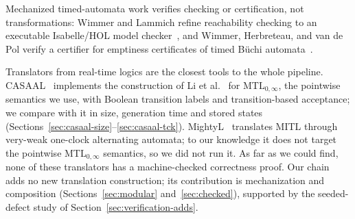 Mechanized timed-automata work verifies checking or certification, not transformations: Wimmer and Lammich refine reachability checking to an executable Isabelle/HOL model checker~\cite{munta_tacas18,munta_formats19}, and Wimmer, Herbreteau, and van de Pol verify a certifier for emptiness certificates of timed B\"uchi automata~\cite{wimmer_herbreteau_vandepol_formats2020}.

Translators from real-time logics are the closest tools to the whole pipeline. CASAAL~\cite{casaal_tool} implements the construction of Li et al.~\cite{li_spin7} for MTL$_{0,\infty}$, the pointwise semantics we use, with Boolean transition labels and transition-based acceptance; we compare with it in size, generation time and stored states (Sections~\ref{sec:casaal-size}--\ref{sec:casaal-tck}). MightyL~\cite{mightyl_paper17} translates MITL through very-weak one-clock alternating automata; to our knowledge it does not target the pointwise MTL$_{0,\infty}$ semantics, so we did not run it. As far as we could find, none of these translators has a machine-checked correctness proof. Our chain adds no new translation construction; its contribution is mechanization and composition (Sections~\ref{sec:modular} and~\ref{sec:checked}), supported by the seeded-defect study of Section~\ref{sec:verification-adds}.

